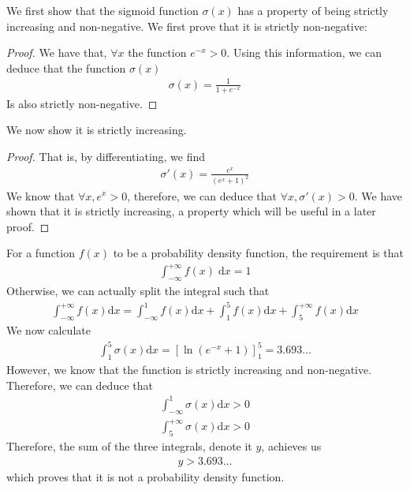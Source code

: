 \documentclass[a4paper]{article}
\theoremstyle{plain}
\theoremstyle{definition}
\theoremstyle{remark}
\begin{document}
\noindent We first show that the sigmoid function $\sigma(x)$ has a property of being strictly increasing and non-negative. We first prove that it is strictly non-negative:
\begin{proof}
	We have that, $\forall x$ the function $e^{-x} > 0$. Using this information, we can deduce that the function $\sigma(x)$
	 \begin{align*}
		\sigma(x) = \frac{1}{1+e^{-x}}
	\end{align*}
	Is also strictly non-negative.
\end{proof}
\noindent We now show it is strictly increasing.
\begin{proof}
	That is, by differentiating, we find
\begin{align*}
	\sigma '(x) = \frac{e^{x}}{\left( e^{x}+1 \right) ^2}
\end{align*}
We know that $\forall x, e^x > 0$, therefore, we can deduce that $\forall x, \sigma'(x) >0$. We have shown that it is strictly increasing, a property which will be useful in a later proof.
\end{proof}
\noindent For a function $f(x)$ to be a probability density function, the requirement is that
\begin{align*}
	\int_{-\infty}^{+\infty} f(x) \; \mathrm{d}x = 1
\end{align*}
Otherwise, we can actually split the integral such that
\begin{align*}
	\int_{-\infty}^{+\infty} f(x) \mathrm{d} x =	\int_{-\infty} ^{1} f(x) \mathrm{d}x + \int_1^{5} f(x) \mathrm{d}x + \int_5^{+\infty} f(x) \mathrm{d}x
\end{align*}
We now calculate
\begin{align*}
	\int_1^{5} \sigma(x) \mathrm{d}x = \left[\ln\left( e^{-x}+1 \right)  \right]_{1}^{5} = 3.693\ldots
\end{align*}
However, we know that the function is strictly increasing and non-negative. Therefore, we can deduce that
\begin{align*}
	\int_{-\infty}^{1} \sigma(x) \mathrm{d}x > 0 \\
	\int_5^{+\infty} \sigma(x) \mathrm{d} x > 0 
\end{align*}
Therefore, the sum of the three integrals, denote it $y$, achieves us
\begin{align*}
	y >3.693\ldots
\end{align*}
which proves that it is not a probability density function.
\end{document}
